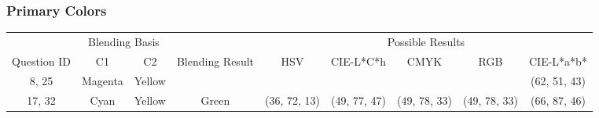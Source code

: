 \subsubsection{Primary Colors}
\label{subsubsec:primarycolors}
%
\begin{table}[htbp]
  \centering
  \vspace{-5pt}
  \resizebox{\textwidth}{!} {
  \begin{tabular}{ccccclclclclcl}
    \hline
                                  & \multicolumn{2}{c}{Blending Basis}                          &                                                                          & \multicolumn{10}{c}{Possible Results}                                                                                                                                                                                                                                                                                                                                                                 \\ \cline{2-3} \cline{5-14}
    \multirow{-2}{*}{Question ID} & C1                           & C2                           & \multirow{-2}{*}{Blending Result}                                        & \multicolumn{2}{c}{HSV}                                                         & \multicolumn{2}{c}{CIE-L*C*h}                                                    & \multicolumn{2}{c}{CMYK}                                                         & \multicolumn{2}{c}{RGB}                                                          & \multicolumn{2}{c}{CIE-L*a*b*}                             \\ \hline
    \multicolumn{1}{c|}{8, 25}    & \multicolumn{1}{c|}{Magenta} & \multicolumn{1}{c||}{Yellow}  & \multicolumn{1}{c||}{\cellcolor[HTML]{FF0000}{\color[HTML]{FFFFFF} Red}}  & \multicolumn{2}{c||}{\cellcolor[HTML]{FF0000}{\color[HTML]{FFFFFF} (41, 21, 2)}} & \multicolumn{2}{c||}{\cellcolor[HTML]{FF6755}{\color[HTML]{FFFFFF} (48, 32, 12)}} & \multicolumn{2}{c||}{\cellcolor[HTML]{FF8080}{\color[HTML]{FFFFFF} (53, 38, 25)}} & \multicolumn{2}{c||}{\cellcolor[HTML]{FF8080}{\color[HTML]{FFFFFF} (53, 38, 25)}} & \multicolumn{2}{c|}{\cellcolor[HTML]{FFA6A6}(62, 51, 43)}  \\ \hline \hline
    \multicolumn{1}{c|}{17, 32}   & \multicolumn{1}{c|}{Cyan}    & \multicolumn{1}{c||}{Yellow}  & \multicolumn{1}{c||}{\cellcolor[HTML]{00FF00}Green}                       & \multicolumn{2}{c||}{\cellcolor[HTML]{00FF00}(36, 72, 13)}                       & \multicolumn{2}{c||}{\cellcolor[HTML]{6EFFA3}(49, 77, 47)}                        & \multicolumn{2}{c||}{\cellcolor[HTML]{80FF80}(49, 78, 33)}                        & \multicolumn{2}{c||}{\cellcolor[HTML]{80FF80}(49, 78, 33)}                        & \multicolumn{2}{c|}{\cellcolor[HTML]{C4FF9E}(66, 87, 46)}  \\ \hline \hline

\end{tabular}}
\end{table}
